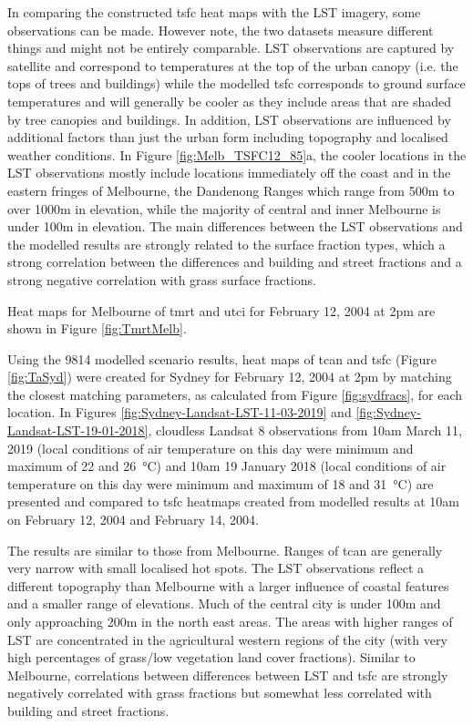 \documentclass[final,3p,times,authoryear]{elsarticle}
\begin{document}
In comparing the constructed \gls{tsfc} heat maps with the LST imagery, some observations can be made. However note, the two datasets measure different things and might not be entirely comparable. LST observations are captured by satellite and correspond to temperatures at the top of the urban canopy (i.e. the tops of trees and buildings) while the modelled \gls{tsfc} corresponds to ground surface temperatures and will generally be cooler as they include areas that are shaded by tree canopies and buildings. In addition, LST observations are influenced by additional factors than just the urban form including topography and localised weather conditions. In Figure \ref{fig:Melb_TSFC12_85}a, the cooler locations in the LST observations mostly include locations immediately off the coast and in the eastern fringes of Melbourne, the Dandenong Ranges which range from 500m to over 1000m in elevation, while the majority of central and inner Melbourne is under 100m in elevation. The main differences between the LST observations and the modelled results are strongly related to the surface fraction types, which a strong correlation between the differences and building and street fractions and a strong negative correlation with grass surface fractions. 


Heat maps for Melbourne of \gls{tmrt} and \gls{utci} for February 12, 2004 at 2pm are shown in Figure \ref{fig:TmrtMelb}.



Using the 9814 modelled scenario results, heat maps of \gls{tcan} and \gls{tsfc} (Figure \ref{fig:TaSyd}) were created for Sydney for February 12, 2004 at 2pm by matching the closest matching parameters, as calculated from Figure \ref{fig:sydfracs}, for each location. In Figures \ref{fig:Sydney-Landsat-LST-11-03-2019} and \ref{fig:Sydney-Landsat-LST-19-01-2018}, cloudless Landsat 8 observations from 10am March 11, 2019 (local conditions of air temperature on this day were minimum and maximum of 22 and 26\SI{}{\degreeCelsius}) and 10am 19 January 2018 (local conditions of air temperature on this day were minimum and maximum of 18 and 31\SI{}{\degreeCelsius}) are presented and compared to \gls{tsfc} heatmaps created from modelled results at 10am on February 12, 2004 and February 14, 2004. 

The results are similar to those from Melbourne. Ranges of \gls{tcan} are generally very narrow with small localised hot spots. The LST observations reflect a different topography than Melbourne with a larger influence of coastal features and a smaller range of elevations. Much of the central city is under 100m and only approaching 200m in the north east areas. The areas with higher ranges of LST are concentrated in the agricultural western regions of the city (with very high percentages of grass/low vegetation land cover fractions). Similar to Melbourne, correlations between differences between LST and \gls{tsfc} are strongly negatively correlated with grass fractions but somewhat less correlated with building and street fractions.
\end{document}
